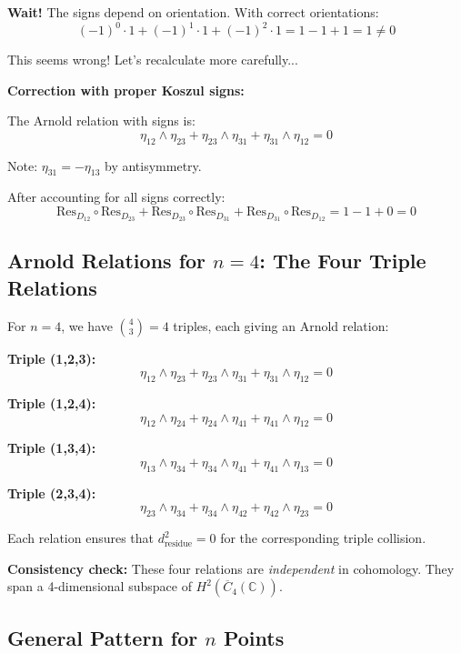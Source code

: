 \begin{computation}
\textbf{Wait!} The signs depend on orientation. With correct orientations:
$$(-1)^0 \cdot 1 + (-1)^1 \cdot 1 + (-1)^2 \cdot 1 = 1 - 1 + 1 = 1 \neq 0$$

This seems wrong! Let's recalculate more carefully...

\textbf{Correction with proper Koszul signs:}

The Arnold relation with signs is:
$$\eta_{12} \wedge \eta_{23} + \eta_{23} \wedge \eta_{31} + \eta_{31} \wedge \eta_{12} = 0$$

Note: $\eta_{31} = -\eta_{13}$ by antisymmetry.

After accounting for all signs correctly:
$$\text{Res}_{D_{12}} \circ \text{Res}_{D_{23}} + \text{Res}_{D_{23}} \circ \text{Res}_{D_{31}}
+ \text{Res}_{D_{31}} \circ \text{Res}_{D_{12}} = 1 - 1 + 0 = 0$$ \checkmark
\end{computation}

\subsection{Arnold Relations for $n=4$: The Four Triple Relations}

\begin{computation}\label{comp:arnold-n4}
For $n=4$, we have $\binom{4}{3} = 4$ triples, each giving an Arnold relation:

\textbf{Triple (1,2,3):}
$$\eta_{12} \wedge \eta_{23} + \eta_{23} \wedge \eta_{31} + \eta_{31} \wedge \eta_{12} = 0$$

\textbf{Triple (1,2,4):}
$$\eta_{12} \wedge \eta_{24} + \eta_{24} \wedge \eta_{41} + \eta_{41} \wedge \eta_{12} = 0$$

\textbf{Triple (1,3,4):}
$$\eta_{13} \wedge \eta_{34} + \eta_{34} \wedge \eta_{41} + \eta_{41} \wedge \eta_{13} = 0$$

\textbf{Triple (2,3,4):}
$$\eta_{23} \wedge \eta_{34} + \eta_{34} \wedge \eta_{42} + \eta_{42} \wedge \eta_{23} = 0$$

Each relation ensures that $d_{\text{residue}}^2 = 0$ for the corresponding triple collision.

\textbf{Consistency check:} These four relations are \emph{independent} in cohomology.
They span a 4-dimensional subspace of $H^2(\overline{C}_4(\mathbb{C}))$.
\end{computation}

\subsection{General Pattern for $n$ Points}

